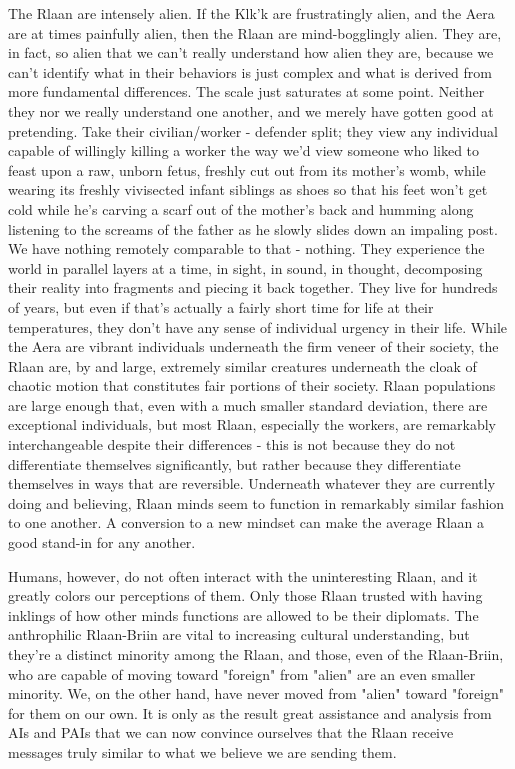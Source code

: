 The Rlaan are intensely alien. If the Klk'k are frustratingly alien,
and the Aera are at times painfully alien, then the Rlaan are
mind-bogglingly alien. They are, in fact, so alien that we can't
really understand how alien they are, because we can't identify what
in their behaviors is just complex and what is derived from more
fundamental differences. The scale just saturates at some
point. Neither they nor we really understand one another, and we
merely have gotten good at pretending. Take their civilian/worker -
defender split; they view any individual capable of willingly killing
a worker the way we'd view someone who liked to feast upon a raw,
unborn fetus, freshly cut out from its mother's womb, while wearing
its freshly vivisected infant siblings as shoes so that his feet won't get
cold while he's carving a scarf out of the mother's back and humming
along listening to the screams of the father as he slowly slides down
an impaling post. We have nothing remotely comparable to that -
nothing. They experience the world in parallel layers at a time, in
sight, in sound, in thought, decomposing their reality into fragments
and piecing it back together. They live for hundreds of years, but even
if that's actually a fairly short time for life at their temperatures,
they don't have any sense of individual urgency in their life. While
the Aera are vibrant individuals underneath the firm veneer of their
society, the Rlaan are, by and large, extremely similar creatures
underneath the cloak of chaotic motion that constitutes fair portions
of their society. Rlaan populations are large enough that, even with a
much smaller standard deviation, there are exceptional individuals,
but most Rlaan, especially the workers, are remarkably interchangeable
despite their differences - this is not because they do not
differentiate themselves significantly, but rather because they
differentiate themselves in ways that are reversible. Underneath
whatever they are currently doing and believing, Rlaan minds seem to
function in remarkably similar fashion to one another. A conversion to
a new mindset can make the average Rlaan a good stand-in for any
another.

Humans, however, do not often interact with the uninteresting Rlaan,
and it greatly colors our perceptions of them. Only those Rlaan
trusted with having inklings of how other minds functions are allowed
to be their diplomats. The anthrophilic Rlaan-Briin are vital to
increasing cultural understanding, but they're a distinct minority
among the Rlaan, and those, even of the Rlaan-Briin, who are capable
of moving toward "foreign" from "alien" are an even smaller
minority. We, on the other hand, have never moved from "alien" toward
"foreign" for them on our own. It is only as the result great
assistance and analysis from AIs and PAIs that we can now convince
ourselves that the Rlaan receive messages truly similar to what we
believe we are sending them.

